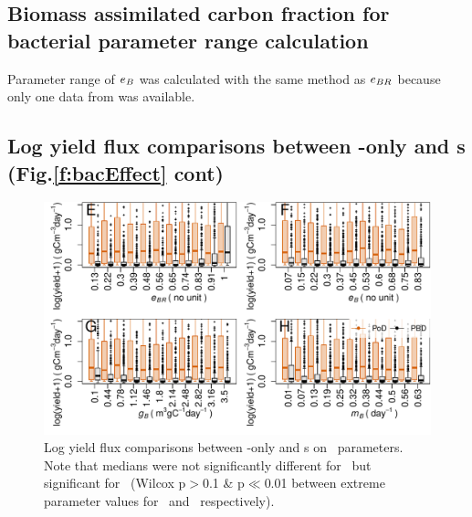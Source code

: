 \documentclass[env.tex]{subfiles}
\begin{document}
\subsection{Biomass assimilated carbon fraction for bacterial parameter range calculation}
Parameter range of $e_B$ was calculated with the same method as $e_{BR}$ because only one data from  \autocite{cochran1988estimation} was available.

\subsection{Log yield flux comparisons between \phy-only and \pbs s (Fig.\ref{f:bacEffect} cont)}
\begin{figure}[H]
    \centering
    \includegraphics[width=.95\linewidth]{result/bacEff2.pdf}
    \caption[Log yield flux comparisons between feasible \phy-only and \pbs s (Fig.\ref{f:bacEffect} cont)]{Log yield flux comparisons between \phy-only and \pbs s on \bac\ parameters.  Note that medians were not significantly different for \PoN\ but significant for \PBN\ (Wilcox p$>$0.1 \& p$\ll$0.01 between extreme parameter values for \PoN\ and \PBN\ respectively).\lnExplain}
    \label{f:bacEffect2}
\end{figure}
\end{document}
